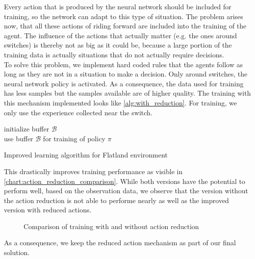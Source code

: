 Every action that is produced by the neural network should be included for training, so the network can adapt to this type of situation. The problem arises now, that all these actions of riding forward are included into the training of the agent. The influence of the actions that actually matter (e.g. the ones around switches) is thereby not as big as it could be, because a large portion of the training data is actually situations that do not actually require decisions.\\
To solve this problem, we implement hard coded rules that the agents follow as long as they are not in a situation to make a decision. Only around switches, the neural network policy is activated. As a consequence, the data used for training has less samples but the samples available are of higher quality. The training with this mechanism implemented looks like \autoref{alg:with_reduction}.
For training, we only use the experience collected near the switch.\\
\begin{algorithm}[H]
	initialize buffer $\mathcal{B}$\\
	use buffer $\mathcal{B}$ for training of policy $\pi$

	\caption{Improved learning algorithm for Flatland environment}
	\label{alg:with_reduction}
\end{algorithm}
This drastically improves training performance as visible in \autoref{chart:action_reduction_comparison}. While both versions have the potential to perform well, based on the observation data, we observe that the version without the action reduction is not able to performe nearly as well as the improved version with reduced actions.
\begin{figure}[H]
	\begin{center}
		
	\end{center}
	\caption{Comparison of training with and without action reduction}
	\label{chart:action_reduction_comparison}
\end{figure}
As a consequence, we keep the reduced action mechanism as part of our final solution.
